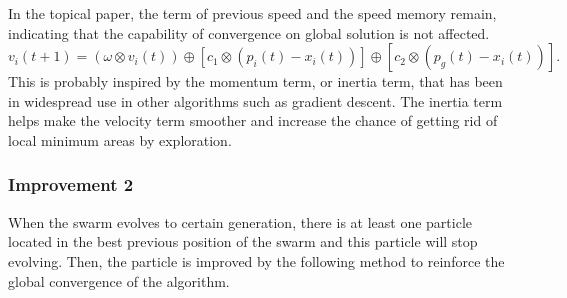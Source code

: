 \documentclass{IEEEtran}
\begin{document}
{{{            In the topical paper, the term of previous speed and the speed memory remain, indicating that the capability of convergence on global solution is not affected.
            $$v_i(t+1) = (\omega \otimes v_i(t)) \oplus [c_1 \otimes (p_i(t) - x_i(t))] \oplus [c_2 \otimes (p_g(t) - x_i(t))].$$
            This is probably inspired by the momentum term, or inertia term, that has been in widespread use in other algorithms such as gradient descent.
            The inertia term helps make the velocity term smoother and increase the chance of getting rid of local minimum areas by exploration.
        }

        \subsubsection{Improvement 2}
        {
            When the swarm evolves to certain generation, 
            there is at least one particle located in the best previous position of the swarm and this particle will stop evolving. 
            Then, the particle is improved by the following method to reinforce the global convergence of the algorithm.
        }
    }

}



\end{document}
